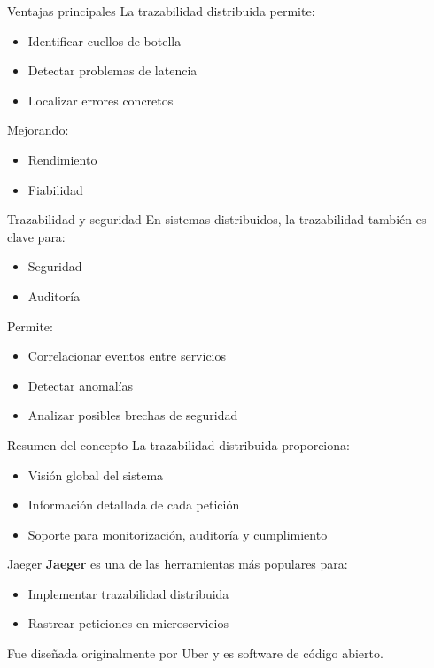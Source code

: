 \documentclass{beamer}
\begin{document}
\begin{frame}{Ventajas principales}
La trazabilidad distribuida permite:
\begin{itemize}
    \item Identificar cuellos de botella
    \item Detectar problemas de latencia
    \item Localizar errores concretos
\end{itemize}

\vspace{0.3cm}
Mejorando:
\begin{itemize}
    \item Rendimiento
    \item Fiabilidad
\end{itemize}
\end{frame}

\begin{frame}{Trazabilidad y seguridad}
En sistemas distribuidos, la trazabilidad también es clave para:
\begin{itemize}
    \item Seguridad
    \item Auditoría
\end{itemize}

\vspace{0.3cm}
Permite:
\begin{itemize}
    \item Correlacionar eventos entre servicios
    \item Detectar anomalías
    \item Analizar posibles brechas de seguridad
\end{itemize}
\end{frame}

\begin{frame}{Resumen del concepto}
La trazabilidad distribuida proporciona:
\begin{itemize}
    \item Visión global del sistema
    \item Información detallada de cada petición
    \item Soporte para monitorización, auditoría y cumplimiento
\end{itemize}
\end{frame}


\begin{frame}{Jaeger}
\textbf{Jaeger} es una de las herramientas más populares para:
\begin{itemize}
    \item Implementar trazabilidad distribuida
    \item Rastrear peticiones en microservicios
\end{itemize}

\vspace{0.3cm}
Fue diseñada originalmente por Uber y es software de código abierto.
\end{frame}
\end{document}
